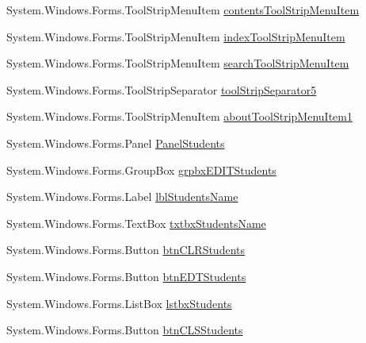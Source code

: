 \begin{DoxyCompactItemize}
\item 
\-System.\-Windows.\-Forms.\-Tool\-Strip\-Menu\-Item \hyperlink{class_sr_p___classroom_inq_1_1frm_classrrom_inq_ac8e6b07efe8b6fe7e1a82d326648f88e}{contents\-Tool\-Strip\-Menu\-Item}
\item 
\-System.\-Windows.\-Forms.\-Tool\-Strip\-Menu\-Item \hyperlink{class_sr_p___classroom_inq_1_1frm_classrrom_inq_a650650a8a1948b902bae347f3cdf9679}{index\-Tool\-Strip\-Menu\-Item}
\item 
\-System.\-Windows.\-Forms.\-Tool\-Strip\-Menu\-Item \hyperlink{class_sr_p___classroom_inq_1_1frm_classrrom_inq_aa54fbd91dddb42716ec00341ee7ac713}{search\-Tool\-Strip\-Menu\-Item}
\item 
\-System.\-Windows.\-Forms.\-Tool\-Strip\-Separator \hyperlink{class_sr_p___classroom_inq_1_1frm_classrrom_inq_ae8424b2612bda51525d313c05df65bb0}{tool\-Strip\-Separator5}
\item 
\-System.\-Windows.\-Forms.\-Tool\-Strip\-Menu\-Item \hyperlink{class_sr_p___classroom_inq_1_1frm_classrrom_inq_ab34838f16ac4c613949fc6e6b18e972d}{about\-Tool\-Strip\-Menu\-Item1}
\item 
\-System.\-Windows.\-Forms.\-Panel \hyperlink{class_sr_p___classroom_inq_1_1frm_classrrom_inq_a70fa7dcce9d5cbc3564066532704c216}{\-Panel\-Students}
\item 
\-System.\-Windows.\-Forms.\-Group\-Box \hyperlink{class_sr_p___classroom_inq_1_1frm_classrrom_inq_a934cec75a0d91eca5ca9786b078462a3}{grpbx\-E\-D\-I\-T\-Students}
\item 
\-System.\-Windows.\-Forms.\-Label \hyperlink{class_sr_p___classroom_inq_1_1frm_classrrom_inq_ac87221e35b87aece56933aba4e90d11e}{lbl\-Students\-Name}
\item 
\-System.\-Windows.\-Forms.\-Text\-Box \hyperlink{class_sr_p___classroom_inq_1_1frm_classrrom_inq_ad797f7d682d2f40b509b4904fac76461}{txtbx\-Students\-Name}
\item 
\-System.\-Windows.\-Forms.\-Button \hyperlink{class_sr_p___classroom_inq_1_1frm_classrrom_inq_ad2bdef2e6f826a27d003c1a0df8bd2be}{btn\-C\-L\-R\-Students}
\item 
\-System.\-Windows.\-Forms.\-Button \hyperlink{class_sr_p___classroom_inq_1_1frm_classrrom_inq_a527ceba70a2003fe9550f3fb3e307999}{btn\-E\-D\-T\-Students}
\item 
\-System.\-Windows.\-Forms.\-List\-Box \hyperlink{class_sr_p___classroom_inq_1_1frm_classrrom_inq_a0c67f5e900e579981b753ac9853a5141}{lstbx\-Students}
\item 
\-System.\-Windows.\-Forms.\-Button \hyperlink{class_sr_p___classroom_inq_1_1frm_classrrom_inq_a0aed8d1ecf711f52b3a948fdeae6ac5b}{btn\-C\-L\-S\-Students}

\end{DoxyCompactItemize}
